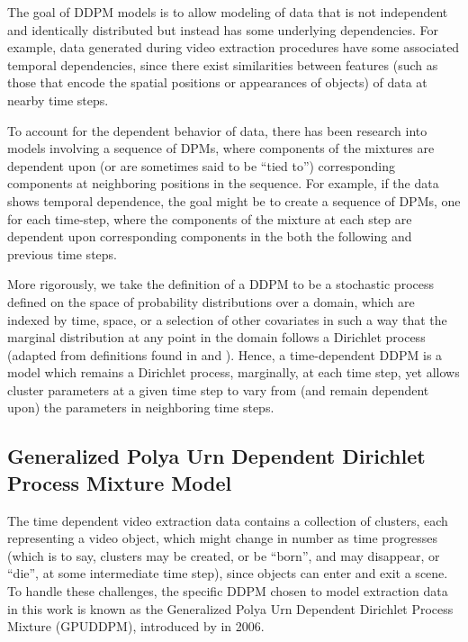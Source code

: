 \documentclass[twocolumn, final]{svjour3}
\begin{document}
The goal of DDPM models is to allow modeling of data that is not independent and identically distributed but instead has some underlying dependencies. For example, data generated during video extraction procedures have some associated temporal dependencies, since there exist similarities between features (such as those that encode the spatial positions or appearances of objects) of data at nearby time steps.

To account for the dependent behavior of data, there has been research into models involving a sequence of DPMs, where components of the mixtures are dependent upon (or are sometimes said to be ``tied to'') corresponding components at neighboring positions in the sequence. For example, if the data shows temporal dependence, the goal might be to create a sequence of DPMs, one for each time-step, where the components of the mixture at each step are dependent upon corresponding components in the both the following and previous time steps.

More rigorously, we take the definition of a DDPM to be a stochastic process defined on the space of probability distributions over a domain, which are indexed by time, space, or a selection of other covariates in such a way that the marginal distribution at any point in the domain follows a Dirichlet process (adapted from definitions found in \cite{gasthaus_thesis} and \cite{griffin2006order}). Hence, a time-dependent DDPM is a model which remains a Dirichlet process, marginally, at each time step, yet allows cluster parameters at a given time step to vary from (and remain dependent upon) the parameters in neighboring time steps.


\subsection{Generalized Polya Urn Dependent Dirichlet Process Mixture Model}
\label{sec:gpuddpmixture}

The time dependent video extraction data contains a collection of clusters, each representing a video object, which might change in number as time progresses (which is to say, clusters may be created, or be ``born'', and may disappear, or ``die'', at some intermediate time step), since objects can enter and exit a scene. To handle these challenges, the specific DDPM chosen to model extraction data in this work is known as the Generalized Polya Urn Dependent Dirichlet Process Mixture (GPUDDPM), introduced by \cite{caron_2007} in 2006.
\end{document}
